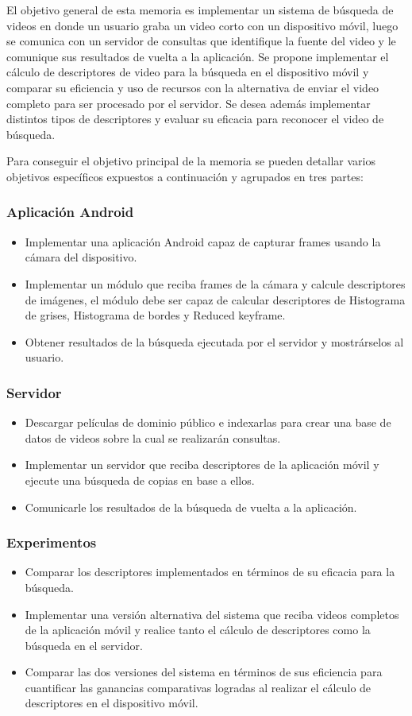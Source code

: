 El objetivo general de esta memoria es implementar un sistema de búsqueda de videos en donde un usuario graba un video corto con un dispositivo móvil, luego se comunica con un servidor de consultas que identifique la fuente del video y le comunique sus resultados de vuelta a la aplicación. Se propone implementar el cálculo de descriptores de video para la búsqueda en el dispositivo móvil y comparar su eficiencia y uso de recursos con la alternativa de enviar el video completo para ser procesado por el servidor. Se desea además implementar distintos tipos de descriptores y evaluar su eficacia para reconocer el video de búsqueda.

Para conseguir el objetivo principal de la memoria se pueden detallar varios objetivos específicos expuestos a continuación y agrupados en tres partes: 
\subsubsection*{Aplicación Android}
\begin{itemize}
\item Implementar una aplicación Android capaz de capturar frames usando la cámara del dispositivo.
\item Implementar un módulo que reciba frames de la cámara y calcule descriptores de imágenes, el módulo debe ser capaz de calcular descriptores de Histograma de grises, Histograma de bordes y Reduced keyframe.
\item Obtener resultados de la búsqueda ejecutada por el servidor y mostrárselos al usuario.
\end{itemize}
\subsubsection*{Servidor}
\begin{itemize}
\item Descargar películas de dominio público e indexarlas para crear una base de datos de videos sobre la cual se realizarán consultas.
\item Implementar un servidor que reciba descriptores de la aplicación móvil y ejecute una búsqueda de copias en base a ellos.
\item Comunicarle los resultados de la búsqueda de vuelta a la aplicación.
\end{itemize}
\subsubsection*{Experimentos}
\begin{itemize}
\item Comparar los descriptores implementados en términos de su eficacia para la búsqueda.
\item Implementar una versión alternativa del sistema que reciba videos completos de la aplicación móvil y realice tanto el cálculo de descriptores como la búsqueda en el servidor.
\item Comparar las dos versiones del sistema en términos de sus eficiencia para cuantificar las ganancias comparativas logradas al realizar el cálculo de descriptores en el dispositivo móvil. 
\end{itemize}

